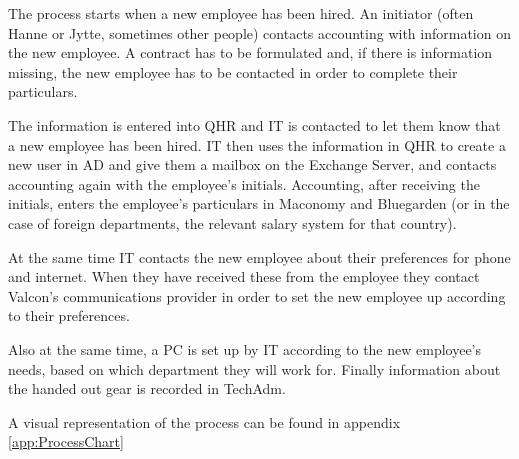 The process starts when a new employee has been hired.
An initiator (often Hanne or Jytte, sometimes other people) contacts accounting with information on the new employee.
A contract has to be formulated and, if there is information missing, the new employee has to be contacted in order to complete their particulars.

The information is entered into QHR and IT is contacted to let them know that a new employee has been hired.
IT then uses the information in QHR to create a new user in AD and give them a mailbox on the Exchange Server, and contacts accounting again with the employee's initials.
Accounting, after receiving the initials, enters the employee's particulars in Maconomy and Bluegarden (or in the case of foreign departments, the relevant salary system for that country).

At the same time IT contacts the new employee about their preferences for phone and internet.
When they have received these from the employee they contact Valcon's communications provider in order to set the new employee up according to their preferences.

Also at the same time, a PC is set up by IT according to the new employee's needs, based on which department they will work for.
Finally information about the handed out gear is recorded in TechAdm.

A visual representation of the process can be found in appendix \ref{app:ProcessChart}